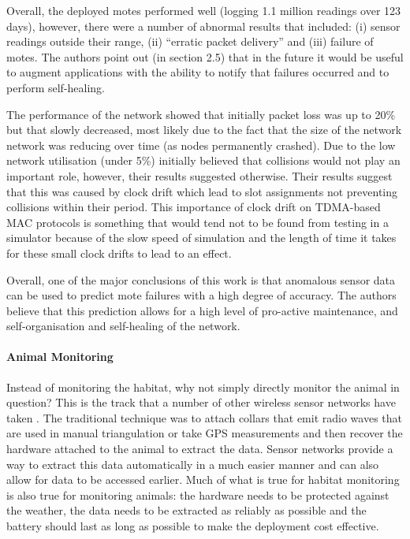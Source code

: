 Overall, the deployed motes performed well (logging 1.1 million readings over 123 days), however, there were a number of abnormal results that included: (i) sensor readings outside their range, (ii) ``erratic packet delivery'' and (iii) failure of motes. The authors point out (in section 2.5) that in the future it would be useful to augment applications with the ability to notify that failures occurred and to perform self-healing.

The performance of the network showed that initially packet loss was up to 20\% but that slowly decreased, most likely due to the fact that the size of the network network was reducing over time (as nodes permanently crashed). Due to the low network utilisation (under 5\%) \citeauthor{SzewczykPMC04} initially believed that collisions would not play an important role, however, their results suggested otherwise. Their results suggest that this was caused by clock drift which lead to slot assignments not preventing collisions within their period. This importance of clock drift on TDMA-based MAC protocols is something that would tend not to be found from testing in a simulator because of the slow speed of simulation and the length of time it takes for these small clock drifts to lead to an effect.

Overall, one of the major conclusions of this work is that anomalous sensor data can be used to predict mote failures with a high degree of accuracy. The authors believe that this prediction allows for a high level of pro-active maintenance, and self-organisation and self-healing of the network.

\paragraph{Animal Monitoring} Instead of monitoring the habitat, why not simply directly monitor the animal in question? This is the track that a number of other wireless sensor networks have taken \cite{Juang:2002:ECW:635508.605408}. The traditional technique was to attach collars that emit radio waves that are used in manual triangulation or take GPS measurements and then recover the hardware attached to the animal to extract the data. Sensor networks provide a way to extract this data automatically in a much easier manner and can also allow for data to be accessed earlier.   Much of what is true for habitat monitoring is also true for monitoring animals: the hardware needs to be protected against the weather, the data needs to be extracted as reliably as possible and the battery should last as long as possible to make the deployment cost effective.

